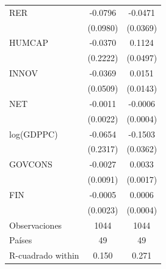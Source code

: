 {\begin{tabular}{l*{2}{c}}
\addlinespace
RER                 &     -0.0796         &     -0.0471         \\
                    &    (0.0980)         &    (0.0369)         \\
\addlinespace
HUMCAP              &     -0.0370         &      0.1124\sym{**} \\
                    &    (0.2222)         &    (0.0497)         \\
\addlinespace
INNOV               &     -0.0369         &      0.0151         \\
                    &    (0.0509)         &    (0.0143)         \\
\addlinespace
NET                 &     -0.0011         &     -0.0006         \\
                    &    (0.0022)         &    (0.0004)         \\
\addlinespace
log(GDPPC)          &     -0.0654         &     -0.1503\sym{***}\\
                    &    (0.2317)         &    (0.0362)         \\
\addlinespace
GOVCONS             &     -0.0027         &      0.0033\sym{*}  \\
                    &    (0.0091)         &    (0.0017)         \\
\addlinespace
FIN                 &     -0.0005         &      0.0006\sym{*}  \\
                    &    (0.0023)         &    (0.0004)         \\
\midrule
Observaciones       &        1044         &        1044         \\
Países              &          49         &          49         \\
R-cuadrado within   &       0.150         &       0.271         \\
\bottomrule
\end{tabular}
}
